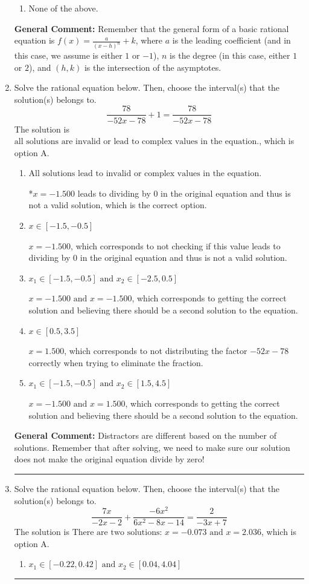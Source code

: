 \documentclass{extbook}[14pt]
\newcommand{\litem}[1]{\item #1

\rule{\textwidth}{0.4pt}}
\begin{document}
\begin{enumerate}
{\begin{enumerate}[label=\Alph*.]
\begin{multicols}{2}
\end{multicols}\item None of the above.\end{enumerate}
\textbf{General Comment:} Remember that the general form of a basic rational equation is $ f(x) = \frac{a}{(x-h)^n} + k$, where $a$ is the leading coefficient (and in this case, we assume is either $1$ or $-1$), $n$ is the degree (in this case, either $1$ or $2$), and $(h, k)$ is the intersection of the asymptotes.
}
\litem{
Solve the rational equation below. Then, choose the interval(s) that the solution(s) belongs to.
\[ \frac{78}{-52x -78} + 1 = \frac{78}{-52x -78} \]The solution is \( \text{all solutions are invalid or lead to complex values in the equation.} \), which is option A.\begin{enumerate}[label=\Alph*.]
\item \( \text{All solutions lead to invalid or complex values in the equation.} \)

*$x = -1.500$ leads to dividing by 0 in the original equation and thus is not a valid solution, which is the correct option.
\item \( x \in [-1.5,-0.5] \)

$x = -1.500$, which corresponds to not checking if this value leads to dividing by 0 in the original equation and thus is not a valid solution.
\item \( x_1 \in [-1.5, -0.5] \text{ and } x_2 \in [-2.5,0.5] \)

$x = -1.500 \text{ and } x = -1.500$, which corresponds to getting the correct solution and believing there should be a second solution to the equation.
\item \( x \in [0.5,3.5] \)

$x = 1.500$, which corresponds to not distributing the factor $-52x -78$ correctly when trying to eliminate the fraction.
\item \( x_1 \in [-1.5, -0.5] \text{ and } x_2 \in [1.5,4.5] \)

$x = -1.500 \text{ and } x = 1.500$, which corresponds to getting the correct solution and believing there should be a second solution to the equation.
\end{enumerate}

\textbf{General Comment:} Distractors are different based on the number of solutions. Remember that after solving, we need to make sure our solution does not make the original equation divide by zero!
}
\litem{
Solve the rational equation below. Then, choose the interval(s) that the solution(s) belongs to.
\[ \frac{7x}{-2x -2} + \frac{-6x^{2}}{6x^{2} -8 x -14} = \frac{2}{-3x + 7} \]The solution is \( \text{There are two solutions: } x = -0.073 \text{ and } x = 2.036 \), which is option A.\begin{enumerate}[label=\Alph*.]
\item \( x_1 \in [-0.22, 0.42] \text{ and } x_2 \in [0.04,4.04] \)


\end{enumerate}}
\end{enumerate}
\end{document}
